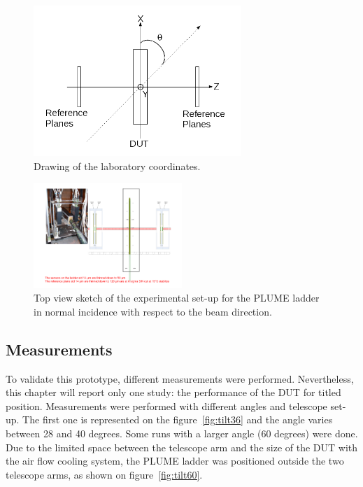     \begin{figure}
      \centering
      \includegraphics[width = 0.7\textwidth]{Pictures/deformation/lab_frame.png}
      \caption{Drawing of the laboratory coordinates.}
      \label{fig:labCoordinates}
    \end{figure}

    \begin{figure}[!h]
      \centering
      \includegraphics[width = 0.5\textwidth]{Pictures/deformation/tb_cern_11_sketch_normal.pdf}
      \caption{Top view sketch of the experimental set-up for the PLUME ladder in normal incidence with respect to the beam direction.}
      \label{fig:tbNormal}
    \end{figure}

    \subsection{Measurements}

    To validate this prototype, different measurements were performed.
    Nevertheless, this chapter will report only one study: the performance of the \gls{DUT} for titled position.
    Measurements were performed with different angles and telescope set-up.
    The first one is represented on the figure~\ref{fig:tilt36} and the angle varies between 28 and 40 degrees.
    Some runs with a larger angle (60 degrees) were done. 
    Due to the limited space between the telescope arm and the size of the \gls{DUT} with the air flow cooling system, the PLUME ladder was positioned outside the two telescope arms, as shown on figure~\ref{fig:tilt60}.

